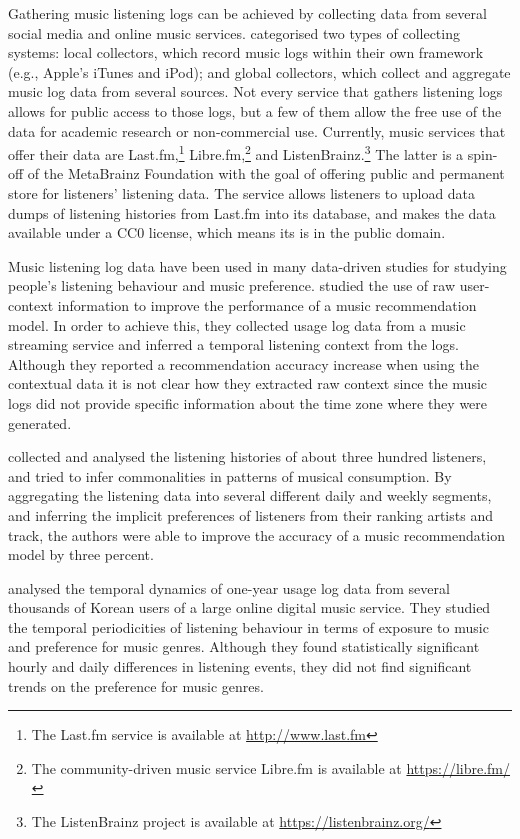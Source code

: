 Gathering music listening logs can be achieved by collecting data from several social media and online music services. \textcite{baur11thesis} categorised two types of collecting systems: local collectors, which record music logs within their own framework (e.g., Apple's iTunes and iPod); and global collectors, which collect and aggregate music log data from several sources. 
Not every service that gathers listening logs allows for public access to those logs, but a few of them allow the free use of the data for academic research or non-commercial use. Currently, music services that offer their data are Last.fm,\footnote{The Last.fm service is available at \url{http://www.last.fm}} Libre.fm,\footnote{The community-driven music service Libre.fm is available at \url{https://libre.fm/}} and ListenBrainz.\footnote{The ListenBrainz project is available at \url{https://listenbrainz.org/}} The latter is a spin-off of the MetaBrainz Foundation with the goal of offering public and permanent store for listeners' listening data. The service allows listeners to upload data dumps of listening histories from Last.fm into its database, and makes the data available under a CC0 license, which means its is in the public domain.



Music listening log data have been used in many data-driven studies for studying people's listening behaviour and music preference. 
\textcite{shin09contextaware} studied the use of raw user-context information to improve the performance of a music recommendation model. In order to achieve this, they collected usage log data from a music streaming service and inferred a temporal listening context from the logs. Although they reported a recommendation accuracy increase when using the contextual data it is not clear how they extracted raw context since the music logs did not provide specific information about the time zone where they were generated. 

\textcite{baltrunas09towards} collected and analysed the listening histories of about three hundred listeners, and tried to infer commonalities in patterns of musical consumption. By aggregating the listening data into several different daily and weekly segments, and inferring the implicit preferences of listeners from their ranking artists and track, the authors were able to improve the accuracy of a music recommendation model by three percent.


\textcite{park10temporal} analysed the temporal dynamics of one-year usage log data from several thousands of Korean users of a large online digital music service. They studied the temporal periodicities of listening behaviour in terms of exposure to music and preference for music genres. Although they found statistically significant hourly and daily differences in listening events, they did not find significant trends on the preference for music genres.

